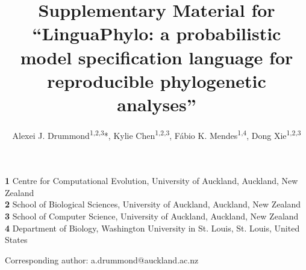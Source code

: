 \documentclass[12pt]{article} %
\begin{document}
\title{Supplementary Material for ``LinguaPhylo: a probabilistic model specification language for reproducible phylogenetic analyses''}

\date{}

\author{
Alexei J. Drummond\textsuperscript{1,2,3}*,
Kylie Chen\textsuperscript{1,2,3},
F\'{a}bio K. Mendes\textsuperscript{1,4},
Dong Xie\textsuperscript{1,2,3}
}

\maketitle 

{\small
\noindent \textbf{1} Centre for Computational Evolution, University of Auckland, Auckland, New Zealand
\\
\textbf{2} School of Biological Sciences, University of Auckland, Auckland, New Zealand
\\
\textbf{3} School of Computer Science, University of Auckland, Auckland, New Zealand
\\
\textbf{4} Department of Biology, Washington University in St. Louis, St. Louis, United States\\
}

\medskip

\noindent *Corresponding author: a.drummond@auckland.ac.nz

\clearpage








\listoftables

\clearpage





\end{document}

